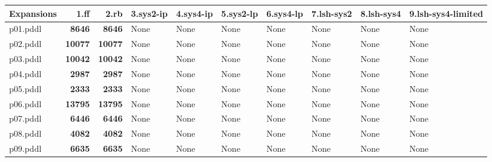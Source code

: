 \documentclass{article}
\begin{document}
\begin{tabular}{@{}lrrrrrrrrr@{}}
Expansions & 1.ff & 2.rb & 3.sys2-ip & 4.sys4-ip & 5.sys2-lp & 6.sys4-lp & 7.lsh-sys2 & 8.lsh-sys4 & 9.lsh-sys4-limited \\
\midrule
p01.pddl & \textbf{8646} & \textbf{8646} & \multicolumn{1}{|l|}{None} & \multicolumn{1}{|l|}{None} & \multicolumn{1}{|l|}{None} & \multicolumn{1}{|l|}{None} & \multicolumn{1}{|l|}{None} & \multicolumn{1}{|l|}{None} & \multicolumn{1}{|l|}{None} \\
p02.pddl & \textbf{10077} & \textbf{10077} & \multicolumn{1}{|l|}{None} & \multicolumn{1}{|l|}{None} & \multicolumn{1}{|l|}{None} & \multicolumn{1}{|l|}{None} & \multicolumn{1}{|l|}{None} & \multicolumn{1}{|l|}{None} & \multicolumn{1}{|l|}{None} \\
p03.pddl & \textbf{10042} & \textbf{10042} & \multicolumn{1}{|l|}{None} & \multicolumn{1}{|l|}{None} & \multicolumn{1}{|l|}{None} & \multicolumn{1}{|l|}{None} & \multicolumn{1}{|l|}{None} & \multicolumn{1}{|l|}{None} & \multicolumn{1}{|l|}{None} \\
p04.pddl & \textbf{2987} & \textbf{2987} & \multicolumn{1}{|l|}{None} & \multicolumn{1}{|l|}{None} & \multicolumn{1}{|l|}{None} & \multicolumn{1}{|l|}{None} & \multicolumn{1}{|l|}{None} & \multicolumn{1}{|l|}{None} & \multicolumn{1}{|l|}{None} \\
p05.pddl & \textbf{2333} & \textbf{2333} & \multicolumn{1}{|l|}{None} & \multicolumn{1}{|l|}{None} & \multicolumn{1}{|l|}{None} & \multicolumn{1}{|l|}{None} & \multicolumn{1}{|l|}{None} & \multicolumn{1}{|l|}{None} & \multicolumn{1}{|l|}{None} \\
p06.pddl & \textbf{13795} & \textbf{13795} & \multicolumn{1}{|l|}{None} & \multicolumn{1}{|l|}{None} & \multicolumn{1}{|l|}{None} & \multicolumn{1}{|l|}{None} & \multicolumn{1}{|l|}{None} & \multicolumn{1}{|l|}{None} & \multicolumn{1}{|l|}{None} \\
p07.pddl & \textbf{6446} & \textbf{6446} & \multicolumn{1}{|l|}{None} & \multicolumn{1}{|l|}{None} & \multicolumn{1}{|l|}{None} & \multicolumn{1}{|l|}{None} & \multicolumn{1}{|l|}{None} & \multicolumn{1}{|l|}{None} & \multicolumn{1}{|l|}{None} \\
p08.pddl & \textbf{4082} & \textbf{4082} & \multicolumn{1}{|l|}{None} & \multicolumn{1}{|l|}{None} & \multicolumn{1}{|l|}{None} & \multicolumn{1}{|l|}{None} & \multicolumn{1}{|l|}{None} & \multicolumn{1}{|l|}{None} & \multicolumn{1}{|l|}{None} \\
p09.pddl & \textbf{6635} & \textbf{6635} & \multicolumn{1}{|l|}{None} & \multicolumn{1}{|l|}{None} & \multicolumn{1}{|l|}{None} & \multicolumn{1}{|l|}{None} & \multicolumn{1}{|l|}{None} & \multicolumn{1}{|l|}{None} & \multicolumn{1}{|l|}{None} \\

\end{tabular}
\end{document}
